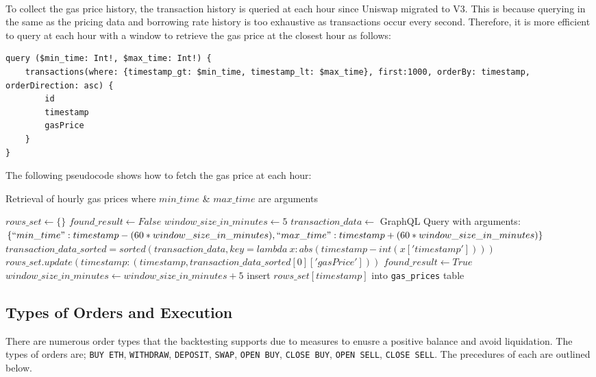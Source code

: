 \\[5mm]
To collect the gas price history, the transaction history is queried at each hour since Uniswap migrated to V3. This is because querying in the same as the pricing data and borrowing rate history is too exhaustive as transactions occur every second. Therefore, it is more efficient to query at each hour with a window to retrieve the gas price at the closest hour as follows:
\vspace{5mm}
\begin{lstlisting}
query ($min_time: Int!, $max_time: Int!) {
    transactions(where: {timestamp_gt: $min_time, timestamp_lt: $max_time}, first:1000, orderBy: timestamp, orderDirection: asc) {
        id
        timestamp
        gasPrice
    }
}
\end{lstlisting}
\vspace{5mm}
The following pseudocode shows how to fetch the gas price at each hour:

\begin{algorithm}
    \caption{Retrieval of hourly gas prices where $min\_time$ \& $max\_time$ are arguments}\label{alg_gas_price_col}
    \begin{algorithmic}
        \State $rows\_set \leftarrow \{\}$
            \State $found\_result \leftarrow False$
            \State $window\_size\_in\_minutes \leftarrow 5$
                \State $transaction\_data \leftarrow$ GraphQL Query with arguments: $\{``min\_time": timestamp - (60 * window\_size\_in\_minutes), ``max\_time": timestamp + (60 * window\_size\_in\_minutes)\}$
                    \State $transaction\_data\_sorted = sorted(transaction\_data, key=lambda\ x:abs(timestamp - int(x['timestamp'])))$
                    \State $rows\_set.update({timestamp: (timestamp, transaction\_data\_sorted[0]['gasPrice'])})$
                    \State $found\_result \leftarrow True$
                \Else
                    \State $window\_size\_in\_minutes \leftarrow window\_size\_in\_minutes + 5$
                \EndIf
            \EndWhile
            \State insert $rows\_set[timestamp]$ into \texttt{gas\_prices} table
        \EndFor
    \end{algorithmic}
\end{algorithm}

\subsection{Types of Orders and Execution}
There are numerous order types that the backtesting supports due to measures to enusre a positive balance and avoid liquidation. The types of orders are; \texttt{BUY\ ETH}, \texttt{WITHDRAW}, \texttt{DEPOSIT}, \texttt{SWAP}, \texttt{OPEN\ BUY}, \texttt{CLOSE\ BUY}, \texttt{OPEN\ SELL}, \texttt{CLOSE\ SELL}. The precedures of each are outlined below.

